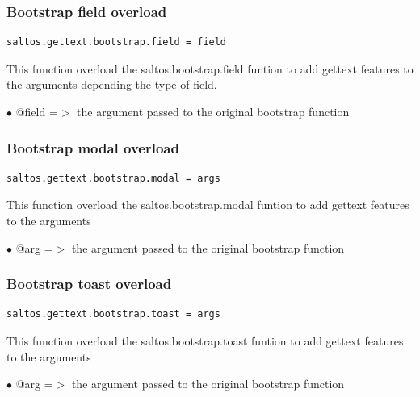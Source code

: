 \documentclass[a4paper]{article}
\begin{document}
\hypertarget{toc245}{}
\subsubsection{Bootstrap field overload}

\begin{lstlisting}
saltos.gettext.bootstrap.field = field
\end{lstlisting}

This function overload the saltos.bootstrap.field funtion to add gettext
features to the arguments depending the type of field.

\begin{compactitem}
\item[\color{myblue}$\bullet$] @field =$>$ the argument passed to the original bootstrap function
\end{compactitem}

\hypertarget{toc246}{}
\subsubsection{Bootstrap modal overload}

\begin{lstlisting}
saltos.gettext.bootstrap.modal = args
\end{lstlisting}

This function overload the saltos.bootstrap.modal funtion to add gettext
features to the arguments

\begin{compactitem}
\item[\color{myblue}$\bullet$] @arg =$>$ the argument passed to the original bootstrap function
\end{compactitem}

\hypertarget{toc247}{}
\subsubsection{Bootstrap toast overload}

\begin{lstlisting}
saltos.gettext.bootstrap.toast = args
\end{lstlisting}

This function overload the saltos.bootstrap.toast funtion to add gettext
features to the arguments

\begin{compactitem}
\item[\color{myblue}$\bullet$] @arg =$>$ the argument passed to the original bootstrap function
\end{compactitem}
\end{document}
